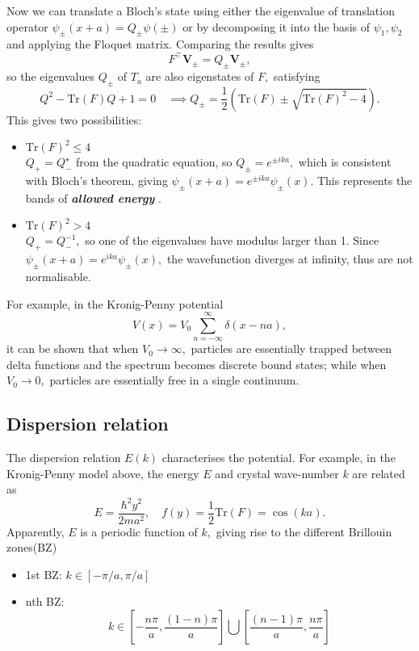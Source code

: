 \documentclass{article}
\theoremstyle{nonumberplain}
\begin{document}
Now we can translate a Bloch's state using either the eigenvalue of translation operator $\psi_{\pm} (x+a) = Q_{\pm} \psi(\pm)$ or by decomposing it into the basis of ${\psi_1, \psi_2}$ and applying the Floquet matrix. Comparing the results gives
\[
    F^{\top} \mathbf{V}_{\pm} = Q_{\pm} \mathbf{V}_{\pm}, 
\] 
so the eigenvalues $Q_{\pm}$ of $T_a$ are also eigenstates of $F,$ satisfying
\[
    \boxed{Q^2 - \mathrm{Tr}(F) Q + 1 =0 } \quad 
    \implies 
    Q_\pm = \frac{1}{2} (\mathrm{Tr}(F) \pm \sqrt{\mathrm{Tr}(F)^2 -4} ).  
\]
This gives two possibilities:
\begin{itemize}
    \item \(\mathrm{Tr}(F)^2 \leq  4\) \\
    \( Q_{+} = Q_{-}^{\star} \) from the quadratic equation, so $Q_{\pm} = e^{\pm i k a},$ which is consistent with Bloch's theorem, giving $\psi_{\pm} (x+a) = e^{\pm ik a} \psi_{\pm} (x). $ This represents the bands of \textit{\textbf{allowed energy}} .  
    \item  \(\mathrm{Tr}(F)^2 > 4\) \\
    \(Q_{+} = Q_{-}^{-1},\) so one of the eigenvalues have modulus larger than 1. Since $\psi_{\pm}(x+a) = e^{i k a} \psi_{\pm}(x),$ the wavefunction diverges at infinity, thus are not normalisable.  
\end{itemize}

For example, in the Kronig-Penny potential 
\[
    V(x) = V_0 \sum_{n=-\infty }^{\infty} \delta(x - n a), 
\]
it can be shown that when $V_0 \to \infty,$ particles are essentially trapped between delta functions and the spectrum becomes discrete bound states; while when $V_0 \to 0,$ particles are essentially free in a single continuum. 

\subsection{Dispersion relation}
The dispersion relation $E(k)$ characterises the potential. For example, in the Kronig-Penny model above, the energy $E$ and crystal wave-number $k$ are related as
\[
    E = \frac{\hbar ^{2} y^{2} }{2ma^{2} }, \quad 
    f(y) = \frac{1}{2}\mathrm{Tr}(F) = \cos (k a).  
\]
Apparently, $E$ is a periodic function of $k,$ giving rise to the different Brillouin zones(BZ)
\begin{itemize}
    \item 1st BZ: \(k \in [-\pi/a, \pi /a]\) 
    \item nth BZ: 
    \[k \in \left[-\frac{n \pi }{a}, \frac{(1-n) \pi }{a}\right] \bigcup \left[ \frac{(n-1)\pi}{a}, \frac{n \pi }{a}\right]\]
\end{itemize}
\end{document}
